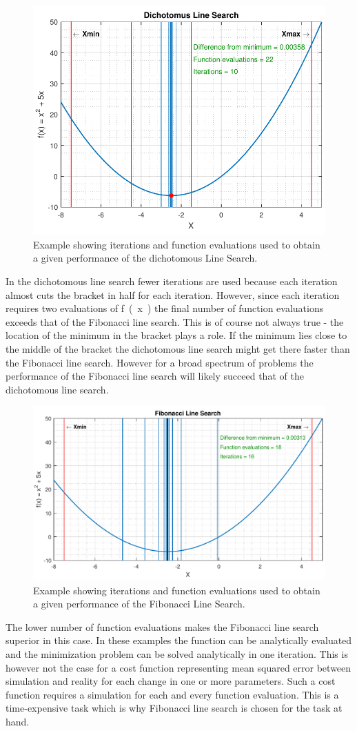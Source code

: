 \begin{figure}[H] 
	\centering
	\includegraphics[width=.6\textwidth]{figures/dichotomousLineSearchPerformance}
	\caption{Example showing iterations and function evaluations used to obtain a given performance of the dichotomous Line Search.}
	\label{dichotomousLineSearchPerformance}
\end{figure}

In the dichotomous line search fewer iterations are used because each iteration almost cuts the bracket in half for each iteration. However, since each iteration requires two evaluations of \si{f(x)} the final number of function evaluations exceeds that of the Fibonacci line search. This is of course not always true - the location of the minimum in the bracket plays a role. If the minimum lies close to the middle of the bracket the dichotomous line search might get there faster than the Fibonacci line search. However for a broad spectrum of problems the performance of the Fibonacci line search will likely succeed that of the dichotomous line search.

\begin{figure}[H] 
	\centering
	\includegraphics[width=.65\textwidth]{figures/fibonacciLineSearchPerformance}
	\caption{Example showing iterations and function evaluations used to obtain a given performance of the Fibonacci Line Search.}
	\label{fibonacciLineSearchPerformance}
\end{figure}

The lower number of function evaluations makes the Fibonacci line search superior in this case. In these examples the function can be analytically evaluated and the minimization problem can be solved analytically in one iteration. This is however not the case for a cost function representing mean squared error between simulation and reality for each change in one or more parameters. Such a cost function requires a simulation for each and every function evaluation. This is a time-expensive task which is why Fibonacci line search is chosen for the task at hand.